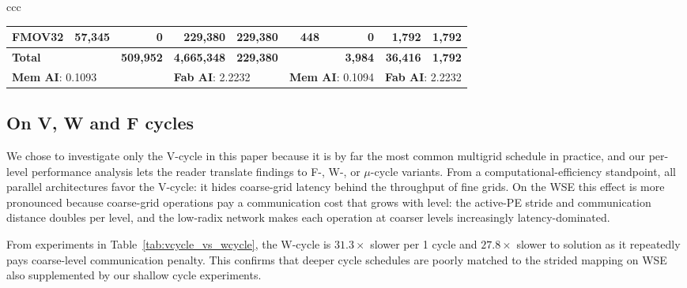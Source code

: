 \documentclass[conference]{IEEEtran}
\begin{document}
\begin{table}[t]
\begin{tabular}{ccc}
\begin{minipage}[t]{0.68\textwidth}
\begin{tabular}{|l||r|r|r|r||r|r|r|r|}
            FMOV32     &   57,345 &         0 &    229,380 & 229,380 &      448 &        0 &      1,792 &   1,792 \\ \hline \hline
            \textbf{Total} & & \textbf{509,952} & \textbf{4,665,348} & \textbf{229,380} & & \textbf{3,984} & \textbf{36,416} & \textbf{1,792} \\ \hline \hline
            \multicolumn{3}{|l||}{\textbf{Mem AI}: 0.1093} & \multicolumn{2}{l||}{\textbf{Fab AI}: 2.2232} & \multicolumn{2}{l|}{\textbf{Mem AI}: 0.1094} & \multicolumn{2}{l|}{\textbf{Fab AI}: 2.2232} \\ \hline
        \end{tabular}
    \end{minipage}
\end{tabular}
\end{table}
        {
        \subsection{On V, W and F cycles}
            We chose to investigate only the V-cycle in this paper because it is by far the most common multigrid schedule in practice, and our per-level performance analysis lets the reader translate findings to F-, W-, or $\mu$-cycle variants. From a computational-efficiency standpoint, all parallel architectures favor the V-cycle: it hides coarse-grid latency behind the throughput of fine grids. On the WSE this effect is more pronounced because coarse-grid operations pay a communication cost that grows with level: the active-PE stride and communication distance doubles per level, %
            and the low-radix network makes each operation at coarser levels %
            increasingly latency-dominated.
            
            From experiments in Table~\ref{tab:vcycle_vs_wcycle}, the W-cycle is $31.3\times$ slower per 1 cycle and $27.8\times$ slower to solution as it repeatedly pays coarse-level communication penalty. This confirms that deeper cycle schedules are poorly matched to the strided mapping on WSE also supplemented by our shallow cycle experiments.

        }
\end{document}
